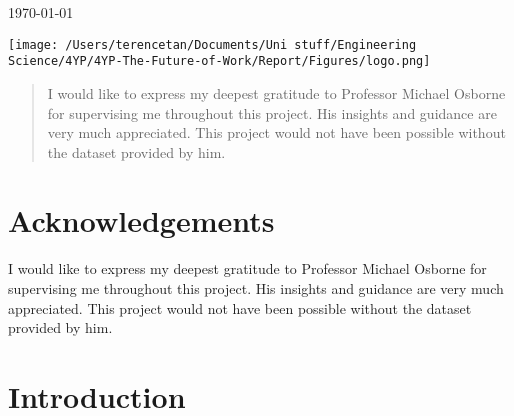 \documentclass[11pt]{article}
\begin{document}
\begin{titlepage}
	
	\vfill\vfill\vfill %
	
	{\large\today} %
	
	
	\vfill\vfill
	\texttt{[image: /Users/terencetan/Documents/Uni stuff/Engineering Science/4YP/4YP-The-Future-of-Work/Report/Figures/logo.png]}\\[1cm] %
	 
	
	\vfill %
	
\end{titlepage}

\begin{abstract}
	I would like to express my deepest gratitude to Professor Michael Osborne for supervising me throughout this project. His insights and guidance are very much appreciated. This project would not have been possible without the dataset provided by him.
   \end{abstract}

\section*{Acknowledgements}

	\thispagestyle{empty}
   I would like to express my deepest gratitude to Professor Michael Osborne for supervising me throughout this project. His insights and guidance are very much appreciated. This project would not have been possible without the dataset provided by him.


\newpage


\section{Introduction}
\label{sec:Introduction}
\end{document}
